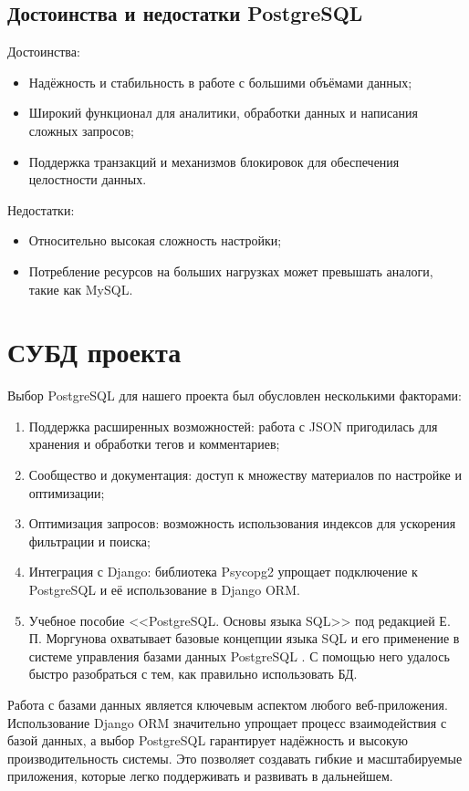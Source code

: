 \subsection*{Достоинства и недостатки PostgreSQL}

Достоинства:
\begin{itemize}
    \item Надёжность и стабильность в работе с большими объёмами данных;
    \item Широкий функционал для аналитики, обработки данных и написания сложных запросов;
    \item Поддержка транзакций и механизмов блокировок для обеспечения целостности данных.
\end{itemize}

Недостатки:
\begin{itemize}
    \item Относительно высокая сложность настройки;
    \item Потребление ресурсов на больших нагрузках может превышать аналоги, такие как MySQL.
\end{itemize}

\section{СУБД проекта}
Выбор PostgreSQL для нашего проекта был обусловлен несколькими факторами:
\begin{enumerate}
    \item Поддержка расширенных возможностей: работа с JSON пригодилась для хранения и обработки тегов и комментариев;
    \item Сообщество и документация: доступ к множеству материалов по настройке и оптимизации;
    \item Оптимизация запросов: возможность использования индексов для ускорения фильтрации и поиска;
    \item Интеграция с Django: библиотека Psycopg2 упрощает подключение к PostgreSQL и её использование в Django ORM.
    \item Учебное пособие <<PostgreSQL. Основы языка SQL>> под редакцией Е. П. Моргунова охватывает базовые концепции языка SQL и его применение в системе управления базами данных PostgreSQL \cite{моргунов2018postgresql}. С помощью него удалось быстро разобраться с тем, как правильно использовать БД.
\end{enumerate}

Работа с базами данных является ключевым аспектом любого веб-приложения. Использование Django ORM значительно упрощает процесс взаимодействия с базой данных, а выбор PostgreSQL гарантирует надёжность и высокую производительность системы. Это позволяет создавать гибкие и масштабируемые приложения, которые легко поддерживать и развивать в дальнейшем.

